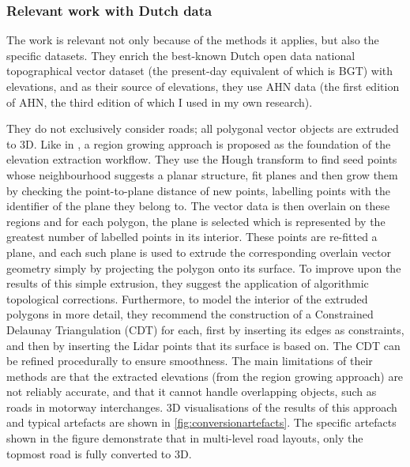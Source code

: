 \subsubsection{Relevant work with Dutch data}

The work \cite{oudeElberink_vosselman_2006} is relevant not only because of the methods it applies, but also the specific datasets. They enrich the best-known Dutch open data national topographical vector dataset (the present-day equivalent of which is BGT) with elevations, and as their source of elevations, they use AHN data (the first edition of AHN, the third edition of which I used in my own research).

They do not exclusively consider roads; all polygonal vector objects are extruded to 3D. Like in \cite{hatger_brenner_2003}, a region growing approach is proposed as the foundation of the elevation extraction workflow. They use the Hough transform to find seed points whose neighbourhood suggests a planar structure, fit planes and then grow them by checking the point-to-plane distance of new points, labelling points with the identifier of the plane they belong to. The vector data is then overlain on these regions and for each polygon, the plane is selected which is represented by the greatest number of labelled points in its interior. These points are re-fitted a plane, and each such plane is used to extrude the corresponding overlain vector geometry simply by projecting the polygon onto its surface. To improve upon the results of this simple extrusion, they suggest the application of algorithmic topological corrections. Furthermore, to model the interior of the extruded polygons in more detail, they recommend the construction of a Constrained Delaunay Triangulation (CDT) for each, first by inserting its edges as constraints, and then by inserting the Lidar points that its surface is based on. The CDT can be refined procedurally to ensure smoothness. The main limitations of their methods are that the extracted elevations (from the region growing approach) are not reliably accurate, and that it cannot handle overlapping objects, such as roads in motorway interchanges. 3D visualisations of the results of this approach and typical artefacts are shown in \ref{fig:conversionartefacts}. The specific artefacts shown in the figure demonstrate that in multi-level road layouts, only the topmost road is fully converted to 3D.

